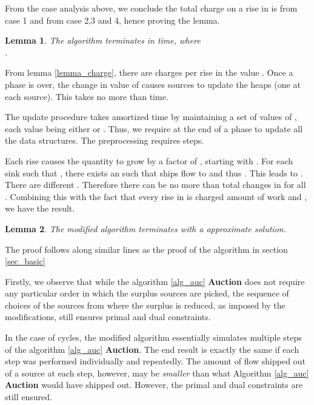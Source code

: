 \documentclass[11pt]{article}
\newenvironment{proof}{\par\noindent{\bf Proof:}}{\mbox{}\hfill\\}
\newtheorem{lemma}{Lemma}[section]
\newcounter{rem}
\begin{document}
{\begin{proof}
From the case analysis above, we conclude the total charge on a rise
in  is   from case 1 and  from case 2,3 and 4, hence
proving the lemma.
\end{proof}



\begin{lemma}
The algorithm terminates in  time, where\\ .
\end{lemma}

\begin{proof}
From lemma \ref{lemma_charge}, there are  charges per rise in  the  
value . Once a phase is over, the change in value of  causes sources to 
update the heaps (one at each source). This takes no more than  time.

The update  procedure takes  amortized time by maintaining a set of
values of  ,
each value being  either  or .
Thus, we require  at the end of a phase
to update all the data structures. The preprocessing requires  steps. 

Each rise causes the quantity  to grow by a factor of , starting with
. 
For each sink  such that , there exists an  such that  ships flow to  and  thus
. This  leads to . There are  different . Therefore
there can be no more than  total changes in   for all .  
Combining this with the fact that every rise in  is charged   amount
of work and , we have the result.
\end{proof}

\begin{lemma}
The modified algorithm terminates with a  approximate solution.
\end{lemma}


\begin{proof}
The proof follows along similar lines as the proof of the algorithm in section \ref{sec_basic}




Firstly, we observe that while the algorithm \ref{alg_auc} {\bf Auction} 
does not require any particular order 
in which the surplus sources are picked, the sequence of choices of 
the sources from where the surplus is reduced,  as imposed by 
the modifications, still ensures  primal and dual constraints.

In the case of cycles, the modified algorithm 
essentially simulates multiple steps of the algorithm
\ref{alg_auc} {\bf Auction}. The end result is exactly the same if each step was 
performed individually
and repeatedly. The amount of flow shipped out of a source at each step, however, may be 
{\em smaller} than what Algorithm \ref{alg_auc} {\bf Auction} would have shipped out. 
However, the primal and dual constraints are still ensured.


\end{proof}}
\end{document}
